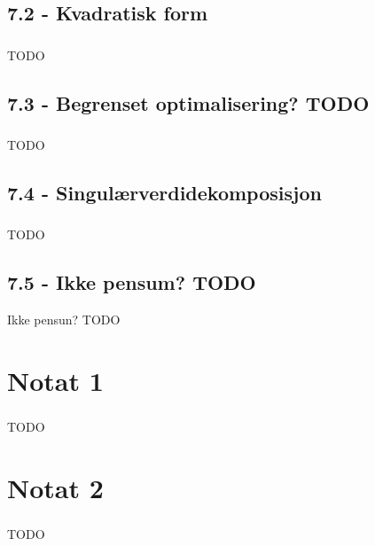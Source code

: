 \documentclass{article}
\begin{document}
    \subsection{7.2 - Kvadratisk form}
      \subsubsection{}
        TODO
    \subsection{7.3 - Begrenset optimalisering? TODO}
      \subsubsection{}
        TODO
    \subsection{7.4 - Singulærverdidekomposisjon}
      \subsubsection{}
        TODO
    \subsection{7.5 - Ikke pensum? TODO}
      Ikke pensun? TODO
  \section{Notat 1}
    \subsubsection{}
      TODO
  \section{Notat 2}
    \subsubsection{}
      TODO
\end{document}
